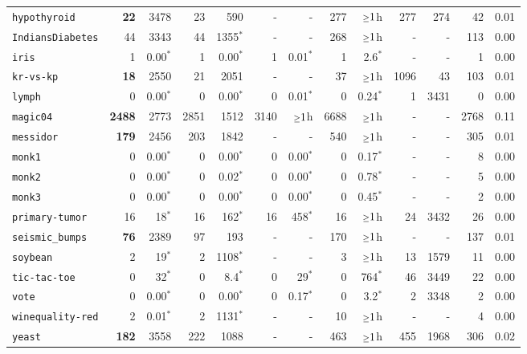 \begin{tabular}{lrrrrrrrrrrrr}
\texttt{hypothyroid} & \textbf{22} & 3478 & 23 & 590 & - & - & 277 & $\mathsmaller{\geq}1$h & 277 & 274 & 42 & 0.01\\
\texttt{IndiansDiabetes} & 44 & 3343 & 44 & 1355$^*$ & - & - & 268 & $\mathsmaller{\geq}1$h & - & - & 113 & 0.00\\
\texttt{iris} & 1 & 0.00$^*$ & 1 & 0.00$^*$ & 1 & 0.01$^*$ & 1 & 2.6$^*$ & - & - & 1 & 0.00\\
\texttt{kr-vs-kp} & \textbf{18} & 2550 & 21 & 2051 & - & - & 37 & $\mathsmaller{\geq}1$h & 1096 & 43 & 103 & 0.01\\
\texttt{lymph} & 0 & 0.00$^*$ & 0 & 0.00$^*$ & 0 & 0.01$^*$ & 0 & 0.24$^*$ & 1 & 3431 & 0 & 0.00\\
\texttt{magic04} & \textbf{2488} & 2773 & 2851 & 1512 & 3140 & $\mathsmaller{\geq}1$h & 6688 & $\mathsmaller{\geq}1$h & - & - & 2768 & 0.11\\
\texttt{messidor} & \textbf{179} & 2456 & 203 & 1842 & - & - & 540 & $\mathsmaller{\geq}1$h & - & - & 305 & 0.01\\
\texttt{monk1} & 0 & 0.00$^*$ & 0 & 0.00$^*$ & 0 & 0.00$^*$ & 0 & 0.17$^*$ & - & - & 8 & 0.00\\
\texttt{monk2} & 0 & 0.00$^*$ & 0 & 0.02$^*$ & 0 & 0.00$^*$ & 0 & 0.78$^*$ & - & - & 5 & 0.00\\
\texttt{monk3} & 0 & 0.00$^*$ & 0 & 0.00$^*$ & 0 & 0.00$^*$ & 0 & 0.45$^*$ & - & - & 2 & 0.00\\
\texttt{primary-tumor} & 16 & 18$^*$ & 16 & 162$^*$ & 16 & 458$^*$ & 16 & $\mathsmaller{\geq}1$h & 24 & 3432 & 26 & 0.00\\
\texttt{seismic\_bumps} & \textbf{76} & 2389 & 97 & 193 & - & - & 170 & $\mathsmaller{\geq}1$h & - & - & 137 & 0.01\\
\texttt{soybean} & 2 & 19$^*$ & 2 & 1108$^*$ & - & - & 3 & $\mathsmaller{\geq}1$h & 13 & 1579 & 11 & 0.00\\
\texttt{tic-tac-toe} & 0 & 32$^*$ & 0 & 8.4$^*$ & 0 & 29$^*$ & 0 & 764$^*$ & 46 & 3449 & 22 & 0.00\\
\texttt{vote} & 0 & 0.00$^*$ & 0 & 0.00$^*$ & 0 & 0.17$^*$ & 0 & 3.2$^*$ & 2 & 3348 & 2 & 0.00\\
\texttt{winequality-red} & 2 & 0.01$^*$ & 2 & 1131$^*$ & - & - & 10 & $\mathsmaller{\geq}1$h & - & - & 4 & 0.00\\
\texttt{yeast} & \textbf{182} & 3558 & 222 & 1088 & - & - & 463 & $\mathsmaller{\geq}1$h & 455 & 1968 & 306 & 0.02\\
\bottomrule
\end{tabular}
